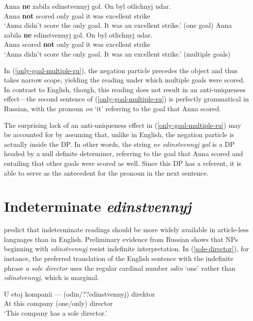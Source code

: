 \documentclass{article}
\begin{document}
\begin{exe}
	\ex \label{only-goal-one-ru} \gll Anna \textbf{ne} zabila edinstvennyj gol. On byl otlichnyj udar.\\
	Anna \textbf{not} scored only goal it was excellent strike\\
	\glt `Anna didn't score the only goal. It was an excellent strike.' (one goal)
	\ex \label{only-goal-multiple-ru} \gll Anna zabila \textbf{ne} edinstvennyj gol. On byl otlichnyj udar.\\
	Anna scored \textbf{not} only goal it was excellent strike\\
	\glt `Anna didn't score the only goal. It was an excellent strike.' (multiple goals)
\end{exe}

In (\ref{only-goal-multiple-ru}), the negation particle precedes the object and thus takes narrow scope, yielding the reading under which multiple goals were scored. In contrast to English, though, this reading does not result in an anti-uniqueness effect---the second sentence of (\ref{only-goal-multiple-ru}) is perfectly grammatical in Russian, with the pronoun \textit{on} `it' referring to the goal that Anna scored.

The surprising lack of an anti-uniqueness effect in (\ref{only-goal-multiple-ru}) may be accounted for by assuming that, unlike in English, the negation particle is actually inside the DP. In other words, the string \textit{ne edinstvennyj gol} is a DP headed by a null definite determiner, referring to the goal that Anna scored and entailing that other goals were scored as well. Since this DP has a referent, it is able to serve as the antecedent for the pronoun in the next sentence.

\section{Indeterminate \textit{edinstvennyj} \label{sec:indet-e}}
\citet{cb2015} predict that indeterminate readings should be more widely available in article-less languages than in English. Preliminary evidence from Russian shows that NPs beginning with \textit{edinstvennyj} resist indefinite interpretation. In (\ref{sole-director}), for instance, the preferred translation of the English sentence with the indefinite phrase \textit{a sole director} uses the regular cardinal number \textit{odin} `one' rather than \textit{edinstvennyj}, which is marginal.

\begin{exe}
	\ex \label{sole-director} \gll U etoj kompanii --- (odin/??edinstvennyj) direktor\\
	At this company {} (one/only) director\\
	\glt `This company has a sole director.'
\end{exe}
\end{document}

